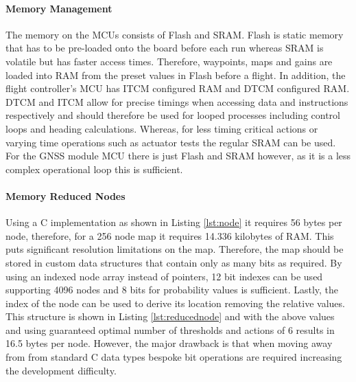 \paragraph{Memory Management}
The memory on the \gls{MCU}s consists of Flash and \gls{SRAM}. Flash is static memory that has to be pre-loaded onto the board before each run whereas \gls{SRAM} is volatile but has faster access times. Therefore, waypoints, maps and gains are loaded into \gls{RAM} from the preset values in Flash before a flight. In addition, the flight controller's \gls{MCU} has \gls{ITCM} configured \gls{RAM} and \gls{DTCM} configured \gls{RAM}. \gls{DTCM} and \gls{ITCM} allow for precise timings when accessing data and instructions respectively and should therefore be used for looped processes including control loops and heading calculations. Whereas, for less timing critical actions or varying time operations such as actuator tests the regular \gls{SRAM} can be used. For the \gls{GNSS} module \gls{MCU} there is just Flash and \gls{SRAM} however, as it is a less complex operational loop this is sufficient. 

\paragraph{Memory Reduced Nodes}
Using a C implementation as shown in Listing \ref{lst:node} it requires 56 bytes per node, therefore, for a 256 node map it requires 14.336 kilobytes of \gls{RAM}. This puts significant resolution limitations on the map. Therefore, the map should be stored in custom data structures that contain only as many bits as required. By using an indexed node array instead of pointers, 12 bit indexes can be used supporting 4096 nodes and 8 bits for probability values is sufficient. Lastly, the index of the node can be used to derive its location removing the relative values. This structure is shown in Listing \ref{lst:reducednode} and with the above values and using guaranteed optimal number of thresholds and actions of 6 results in 16.5 bytes per node. However, the major drawback is that when moving away from from standard C data types bespoke bit operations are required increasing the development difficulty. 
